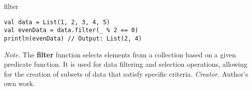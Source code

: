 \begin{table}[h!]
\caption{filter}
\begin{lstlisting}
val data = List(1, 2, 3, 4, 5)
val evenData = data.filter(_ % 2 == 0)
println(evenData) // Output: List(2, 4)
\end{lstlisting}
\small
\textit{Note.} The \textbf{filter} function selects elements from a collection based on a given predicate function. It is used for data filtering and selection operations, allowing for the creation of subsets of data that satisfy specific criteria.
\textit{Creator.} Author's own work.
\end{table}